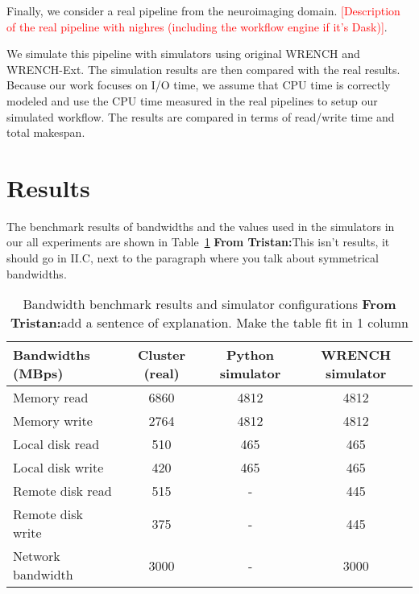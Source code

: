 \documentclass[conference]{IEEEtran}
\newcommand{\tristan}[1]{\color{orange}\textbf{From Tristan:}#1\color{black}}
\begin{document}
            Finally, we consider a real pipeline from the neuroimaging domain.             
            \textcolor{red}{[Description of the real pipeline with nighres 
            (including the workflow engine if it's Dask)]}.              
            
            We simulate this pipeline with simulators using original WRENCH and 
            WRENCH-Ext. 
            The simulation results are then compared with the real results. 
            Because our work focuses on I/O time, we assume that CPU time is 
            correctly modeled and use the CPU time measured in the real pipelines 
            to setup our simulated workflow. The results are compared in terms of 
            read/write time and total makespan.

    \section{Results}
    \label{results}            
        The benchmark results of bandwidths and the values used in the simulators 
        in our all experiments are shown in Table~\ref{table:benchmark} \tristan{This isn't results, it should go in II.C, 
        next to the paragraph where you talk about symmetrical bandwidths}. 
        
        \begin{table}
        \centering
        \begin{tabular}{|l|c|c|c|}
        \hline
            Bandwidths (MBps)  & Cluster (real) & Python simulator & WRENCH simulator\\
        \hline
            Memory read  & 6860    & 4812     & 4812\\
            Memory write & 2764    & 4812 & 4812\\
            Local disk read & 510 & 465 & 465\\
            Local disk write & 420 & 465     & 465\\
            Remote disk read & 515 & - & 445\\
            Remote disk write & 375 & - & 445\\
            Network bandwidth & 3000 & - & 3000\\
        \hline
        \end{tabular}
        \caption{Bandwidth benchmark results and simulator configurations \tristan{add a sentence of explanation. Make the table fit in 1 column}}
        \label{table:benchmark}
        \end{table}        
        
\end{document}
